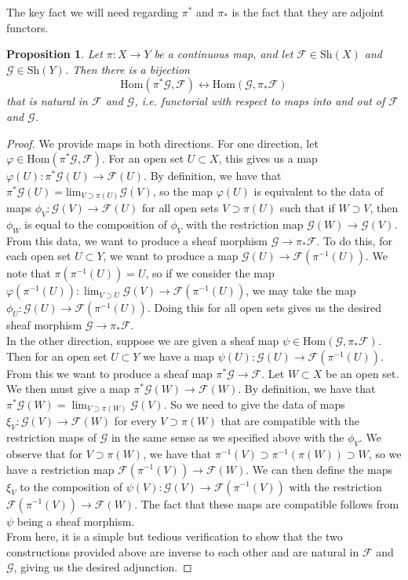\documentclass[psamsfonts, 12pt]{amsart}
\newtheorem{prop}[thm]{Proposition}
\theoremstyle{definition}
\theoremstyle{remark}
\renewcommand{\hom}{\mathrm{Hom}}
\newcommand{\inv}{^{-1}}
\begin{document}
%
The key fact we will need regarding $\pi^*$ and $\pi_*$ is the fact that they
are adjoint functors.
%
\begin{prop}
Let $\pi : X \to Y$ be a continuous map, and let $\mathcal{F} \in \mathrm{Sh}(X)$
and $\mathcal{G} \in \mathrm{Sh}(Y)$. Then there is a bijection
\[
\hom(\pi^*\mathcal{G},\mathcal{F}) \longleftrightarrow
\hom(\mathcal{G},\pi_*\mathcal{F})
\]
that is natural in $\mathcal{F}$ and $\mathcal{G}$, i.e. functorial with respect to
maps into and out of $\mathcal{F}$ and $\mathcal{G}$.
\end{prop}
%
\begin{proof}
We provide maps in both directions. For one direction, let
$\varphi \in \hom(\pi^*\mathcal{G},\mathcal{F})$. For an open set $U \subset X$,
this gives us a map $\varphi(U) : \pi^*\mathcal{G}(U) \to \mathcal{F}(U)$.
By definition, we have that
$\pi^*\mathcal{G}(U) = \mathrm{lim}_{V\supset\pi(U)}\mathcal{G}(V)$, so the
map $\varphi(U)$ is equivalent to the data of maps
$\phi_V : \mathcal{G}(V) \to \mathcal{F}(U)$ for all open sets $V \supset \pi(U)$
such that if $W \supset V$, then $\phi_W$ is equal to the composition of $\phi_V$
with the restriction map $\mathcal{G}(W) \to \mathcal{G}(V)$. From this data,
we want to produce a sheaf morphism $\mathcal{G} \to \pi_*\mathcal{F}$. To do this,
for each open set $U \subset Y$,  we want to produce a map
$\mathcal{G}(U) \to \mathcal{F}(\pi\inv(U))$. We note that $\pi(\pi\inv(U)) = U$,
so if we consider the map
$\varphi(\pi\inv(U)) : \lim_{V \supset U}\mathcal{G}(V) \to \mathcal{F}(\pi\inv(U))$,
we may take the map $\phi_U : \mathcal{G}(U) \to \mathcal{F}(\pi\inv(U))$.
Doing this for all open sets gives us the desired sheaf morphism
$\mathcal{G} \to \pi_*\mathcal{F}$. \\

In the other direction, suppose we are given a sheaf map
$\psi \in \hom(\mathcal{G},\pi_*\mathcal{F})$. Then for an open set $U \subset Y$
we have a map $\psi(U) : \mathcal{G}(U) \to \mathcal{F}(\pi\inv(U))$. From this we
want to produce a sheaf map $\pi^*\mathcal{G} \to \mathcal{F}$. Let $W \subset X$
be an open set. We then must give a map $\pi^*\mathcal{G}(W) \to \mathcal{F}(W)$.
By definition, we have that
$\pi^*\mathcal{G}(W) = \lim_{V \supset \pi(W)}\mathcal{G}(V)$. So we
need to give the data of maps $\xi_V : \mathcal{G}(V) \to \mathcal{F}(W)$
for every $V \supset \pi(W)$ that are compatible with the restriction maps of
$\mathcal{G}$ in the same sense as we specified above with the $\phi_V$. We
observe that for $V \supset \pi(W)$, we have that
$\pi\inv(V) \supset \pi\inv(\pi(W)) \supset W$, so we have a restriction map
$\mathcal{F}(\pi\inv(V)) \to \mathcal{F}(W)$. We can then define the maps
$\xi_V$ to the composition of $\psi(V) : \mathcal{G}(V) \to \mathcal{F}(\pi\inv(V))$
with the restriction $\mathcal{F}(\pi\inv(V)) \to \mathcal{F}(W)$.
The fact that these maps are compatible follows from $\psi$ being a sheaf morphism. \\

From here, it is a simple but tedious verification to show that the two constructions
provided above are inverse to each other and are natural in $\mathcal{F}$ and
$\mathcal{G}$, giving us the desired adjunction.
 \end{proof}
\end{document}
